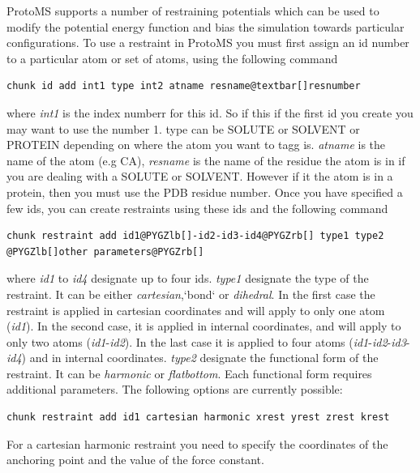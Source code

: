 \documentclass[letterpaper,10pt,english]{manual}
\begin{document}
ProtoMS supports a number of restraining potentials which can be used to modify the potential energy function and bias the simulation towards particular configurations. To use a restraint in ProtoMS you must first assign an id number to a particular atom or set of atoms, using the following command

\begin{Verbatim}[commandchars=@\[\]]
chunk id add int1 type int2 atname resname@textbar[]resnumber
\end{Verbatim}

where \emph{int1} is the index numberr for this id. So if this if the first id you create you may want to use the number 1. type can be SOLUTE or SOLVENT or PROTEIN depending on where the atom you want to tagg is. \emph{atname} is the name of the atom (e.g CA), \emph{resname} is the name of the residue the atom is in if you are dealing with a SOLUTE or SOLVENT. However if it the atom is in a protein, then you must use the PDB residue number.
Once you have specified a few ids, you can create restraints using these ids and the following command

\begin{Verbatim}[commandchars=@\[\]]
chunk restraint add id1@PYGZlb[]-id2-id3-id4@PYGZrb[] type1 type2 @PYGZlb[]other parameters@PYGZrb[]
\end{Verbatim}

where \emph{id1} to \emph{id4} designate up to four ids. \emph{type1} designate the type of the restraint. It can be either \emph{cartesian},{}`bond{}` or \emph{dihedral}. In the first case the restraint is applied in cartesian coordinates and will apply to only one atom (\emph{id1}). In the second case, it is applied in internal coordinates, and will apply to only two atoms (\emph{id1}-\emph{id2}). In the last case it is applied to four atoms (\emph{id1}-\emph{id2}-\emph{id3}-\emph{id4}) and in internal coordinates. \emph{type2} designate the functional form of the restraint. It can be \emph{harmonic} or \emph{flatbottom}. Each functional form requires additional parameters. The following options are currently possible:
\begin{Verbatim}[commandchars=@\[\]]
chunk restraint add id1 cartesian harmonic xrest yrest zrest krest
\end{Verbatim}

For a cartesian harmonic restraint you need to specify the coordinates of the anchoring point and the value of the force constant.
\end{document}
